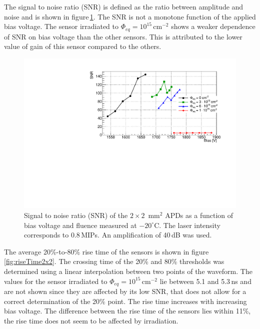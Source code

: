 \documentclass[3p,preprint,twocolumn]{elsarticle}
\begin{document}
The signal to noise ratio (SNR) is defined as the ratio between amplitude and noise and is shown in figure\,\ref{fig:snr2x2}.
The SNR is not a monotone function of the applied bias voltage.
The sensor irradiated to $\Phi_{eq} = 10^{15}$\,cm$^{-2}$ shows a weaker dependence of SNR on bias voltage than the other sensors.
This is attributed to the lower value of gain of this sensor compared to the others.

\begin{figure}
  \centering
  \includegraphics[width = \columnwidth]{snr2x2APDs}
  \caption{Signal to noise ratio (SNR) of the $2 \times 2$~mm$^2$ APDs as a function of bias voltage and fluence measured at $-20^\circ$C. The laser intensity corresponds to 0.8\,MIPs. An amplification of 40\,dB was used.}
  \label{fig:snr2x2}
\end{figure}

The average 20\%-to-80\% rise time of the sensors is shown in figure\,\ref{fig:riseTime2x2}.
The crossing time of the 20\% and 80\% thresholds was determined using a linear interpolation between two points of the waveform.
The values for the sensor irradiated to $\Phi_{eq} = 10^{15}$\,cm$^{-2}$ lie between 5.1 and 5.3\,ns and are not shown since they are affected by its low SNR, that does not allow for a correct determination of the 20\% point.
The rise time increases with increasing bias voltage.
The difference between the rise time of the sensors lies within 11\%, the rise time does not seem to be affected by irradiation.
\end{document}
